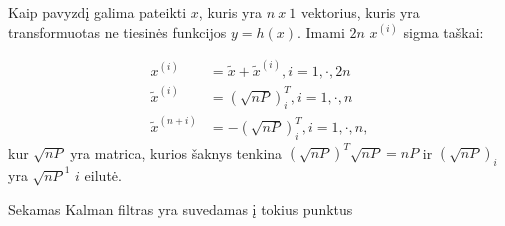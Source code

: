 \documentclass[12pt, a4paper, lithuanian]{article}
\begin{document}
    Kaip pavyzdį galima pateikti $x$, kuris yra $n~x~1$ vektorius, kuris yra transformuotas ne tiesinės funkcijos $y = h(x)$.
    Imami $2n$ $x^{(i)}$ sigma taškai:

    \begin{equation}
        \begin{aligned}
        x^{(i)} &= \tilde{x} + \tilde{x}^{(i)}, i = 1, \cdot, 2n \\
        \tilde{x}^{(i)} &= (\sqrt{nP})^T_i, i = 1,\cdot,n\\
        \tilde{x}^{(n+i)} &= -(\sqrt{nP})^T_i, i = 1, \cdot, n,
        \end{aligned}
    \end{equation}
    kur $\sqrt{nP}$ yra matrica, kurios šaknys tenkina $(\sqrt{nP})^T\sqrt{nP} = nP$ ir $(\sqrt{nP})_i$ yra $\sqrt{nP}^1$ $i$ eilutė.

    Sekamas Kalman filtras yra suvedamas į tokius punktus
\end{document}
